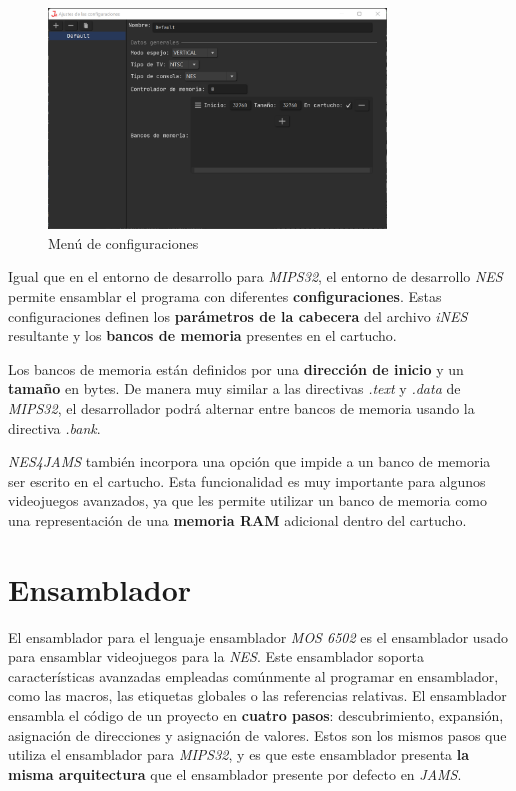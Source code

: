 \begin{figure}[h]
    \centering
    \includegraphics[width=0.8\textwidth]{images/nes/nes-configurations}
    \caption{Menú de configuraciones}
    \label{fig:nes-configurations}
\end{figure}

Igual que en el entorno de desarrollo para \textit{MIPS32},
el entorno de desarrollo \textit{NES} permite ensamblar
el programa con diferentes \textbf{configuraciones}.
Estas configuraciones definen los \textbf{parámetros de la cabecera}
del archivo \textit{iNES} resultante y los \textbf{bancos de memoria}
presentes en el cartucho.

Los bancos de memoria están definidos por una \textbf{dirección de inicio}
y un \textbf{tamaño} en bytes.
De manera muy similar a las directivas \textit{.text}
y \textit{.data} de \textit{MIPS32}, el desarrollador podrá
alternar entre bancos de memoria usando la directiva \textit{.bank}.

\textit{NES4JAMS} también incorpora una opción que impide a un
banco de memoria ser escrito en el cartucho.
Esta funcionalidad es muy importante para algunos videojuegos
avanzados, ya que les permite utilizar un banco de memoria como
una representación de una \textbf{memoria RAM} adicional
dentro del cartucho.


\section{Ensamblador}\label{sec:ensamblador}

El ensamblador para el lenguaje ensamblador \textit{MOS 6502}
es el ensamblador usado para ensamblar videojuegos para la \textit{NES}.
Este ensamblador soporta características avanzadas empleadas
comúnmente al programar en ensamblador, como las macros,
las etiquetas globales o las referencias relativas.
El ensamblador ensambla el código de un proyecto en \textbf{cuatro pasos}:
descubrimiento, expansión, asignación de direcciones y asignación de valores.
Estos son los mismos pasos que utiliza el ensamblador para \textit{MIPS32},
y es que este ensamblador presenta \textbf{la misma arquitectura}
que el ensamblador presente por defecto en \textit{JAMS}.

